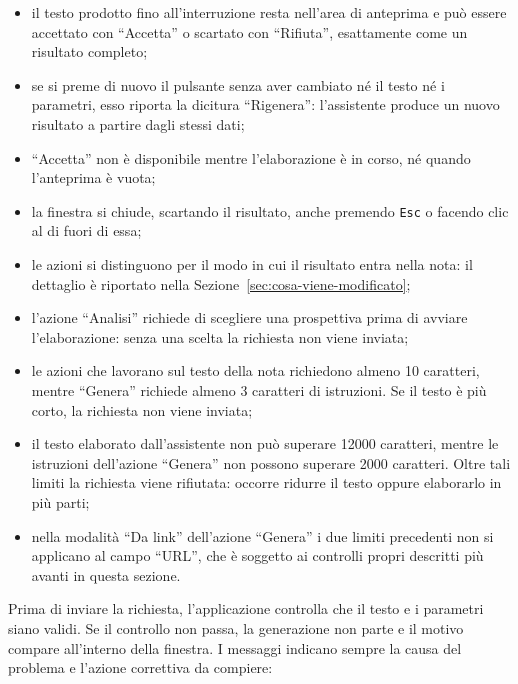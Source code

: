 \documentclass[a4paper, 10pt]{article}
\begin{document}
\begin{itemize}
    \item il testo prodotto fino all'interruzione resta nell'area di anteprima e può essere accettato con ``Accetta'' o scartato con ``Rifiuta'', esattamente come un risultato completo;

    \item se si preme di nuovo il pulsante senza aver cambiato né il testo né i parametri, esso riporta la dicitura ``Rigenera'': l'assistente produce un nuovo risultato a partire dagli stessi dati;

    \item ``Accetta'' non è disponibile mentre l'elaborazione è in corso, né quando l'anteprima è vuota;

    \item la finestra si chiude, scartando il risultato, anche premendo \texttt{Esc} o facendo clic al di fuori di essa;

    \item le azioni si distinguono per il modo in cui il risultato entra nella nota: il dettaglio è riportato nella Sezione~\ref{sec:cosa-viene-modificato};

    \item l'azione ``Analisi'' richiede di scegliere una prospettiva prima di avviare l'elaborazione: senza una scelta la richiesta non viene inviata;

    \item le azioni che lavorano sul testo della nota richiedono almeno 10 caratteri, mentre ``Genera'' richiede almeno 3 caratteri di istruzioni. Se il testo è più corto, la richiesta non viene inviata;

    \item il testo elaborato dall'assistente non può superare 12000 caratteri, mentre le istruzioni dell'azione ``Genera'' non possono superare 2000 caratteri. Oltre tali limiti la richiesta viene rifiutata: occorre ridurre il testo oppure elaborarlo in più parti;

    \item nella modalità ``Da link'' dell'azione ``Genera'' i due limiti precedenti non si applicano al campo ``URL'', che è soggetto ai controlli propri descritti più avanti in questa sezione.
\end{itemize}

Prima di inviare la richiesta, l'applicazione controlla che il testo e i parametri siano validi. Se il controllo non passa, la generazione non parte e il motivo compare all'interno della finestra. I messaggi indicano sempre la causa del problema e l'azione correttiva da compiere:
\end{document}
